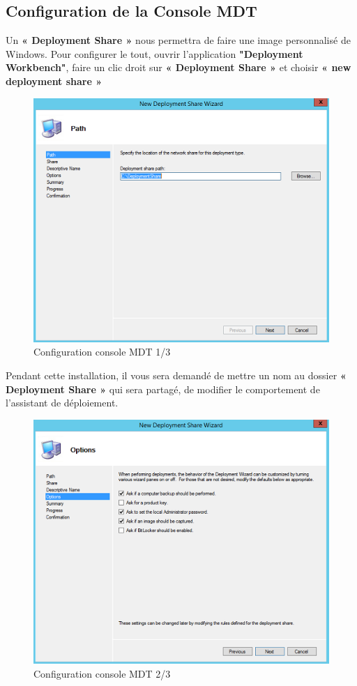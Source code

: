 \documentclass[11pt,a4paper,oneside]{article}
\begin{document}
\newpage
\subsection{Configuration de la Console MDT}
Un \textbf{« Deployment Share »} nous permettra de faire une image personnalisé de Windows. Pour configurer le tout, ouvrir l'application \textbf{"Deployment Workbench"}, faire un clic droit sur \textbf{« Deployment Share »} et choisir \textbf{« new deployment share »}
\begin{figure}[hbtp]
\centering
\includegraphics[scale=0.7]{Pictures/MDT/MDT3.png}
\caption{\label{etiquette} Configuration console MDT 1/3}
\end{figure}

Pendant cette installation, il vous sera demandé de mettre un nom au dossier \textbf{« Deployment Share »} qui sera partagé, de modifier le comportement de l'assistant de déploiement.
\begin{figure}[hbtp]
\centering
\includegraphics[scale=0.7]{Pictures/MDT/MDT4.png}
\caption{\label{etiquette} Configuration console MDT 2/3}
\end{figure}
\end{document}
